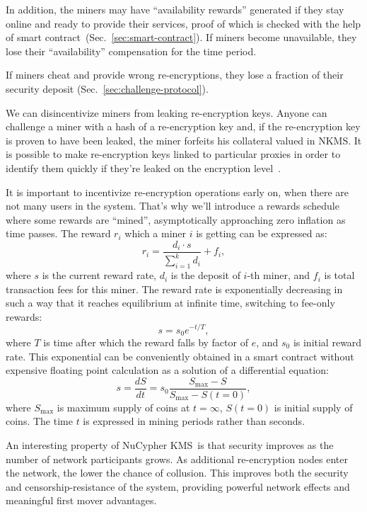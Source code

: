 \documentclass[longbibliography,nofootinbib]{revtex4-1}
\newcommand{\kms}{NuCypher KMS}
\begin{document}
In addition, the miners may have ``availability rewards'' generated if they stay online and ready to provide their services, proof of which is checked with the help of
smart contract~(Sec.~\ref{sec:smart-contract}).
If miners become unavailable, they lose their ``availability'' compensation for the time period.

If miners cheat and provide wrong re-encryptions, they lose a fraction of their security deposit (Sec.~\ref{sec:challenge-protocol}).

We can disincentivize miners from leaking re-encryption keys.
Anyone can challenge a miner with a hash of a re-encryption key and, if the re-encryption key is proven to have been leaked, the miner forfeits his collateral
valued in NKMS.
It is possible to make re-encryption keys linked to particular proxies in order to identify them quickly if they're leaked on the encryption
level~\cite{Libert2008}.

It is important to incentivize re-encryption operations early on, when there are not many users in the system.
That's why we'll introduce a rewards schedule where some rewards are ``mined'', asymptotically approaching zero inflation as time passes.
The reward $r_i$ which a miner $i$ is getting can be expressed as:
\begin{equation}
    r_i = \frac{d_i \cdot s}{\sum_{i=1}^k d_i} + f_i,
\end{equation}
where $s$ is the current reward rate, $d_i$ is the deposit of $i$-th miner, and $f_i$ is total transaction fees for this miner.
The reward rate is exponentially decreasing in such a way that it reaches equilibrium at infinite time, switching to fee-only rewards:
\begin{equation}
    s = s_0 e^{-t/T},
\end{equation}
where $T$ is time after which the reward falls by factor of $e$, and $s_0$ is initial reward rate.
This exponential can be conveniently obtained in a smart contract without expensive floating point calculation as a solution of a differential equation:
\begin{equation}
    s = \frac{dS}{dt}= s_0 \frac{S_{\max} - S}{S_{\max} - S(t=0)},
\end{equation}
where $S_{\max}$ is maximum supply of coins at $t=\infty$, $S(t=0)$ is initial supply of coins.
The time $t$ is expressed in mining periods rather than seconds.

An interesting property of \kms~is that security improves as the number of network participants grows. As additional re-encryption
nodes enter the network, the lower the chance of collusion.
This improves both the security and censorship-resistance of the system, providing powerful network effects and meaningful first mover advantages.
\end{document}
